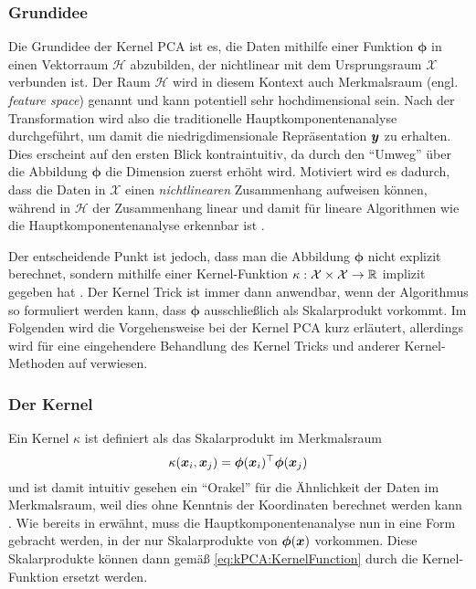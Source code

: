 \subsubsection{Grundidee}
\label{ch:MethodenDerDimRed:statistisch:kPCA:Grundidee}

Die Grundidee der Kernel PCA ist es, die Daten mithilfe einer Funktion $\bm{\phi}$ in einen
Vektorraum $\mathcal{H}$ abzubilden, der nichtlinear mit dem Ursprungsraum $\mathcal{X}$ verbunden
ist. Der Raum $\mathcal{H}$ wird in diesem Kontext auch Merkmalsraum (engl. \textit{feature space})
genannt und kann potentiell sehr hochdimensional sein. Nach der Transformation wird also die
traditionelle Hauptkomponentenanalyse durchgeführt, um damit die niedrigdimensionale Repräsentation
$\bm{y}$ zu erhalten. Dies erscheint auf den ersten Blick kontraintuitiv, da durch den
\enquote{Umweg} über die Abbildung $\bm{\phi}$ die Dimension zuerst erhöht wird. Motiviert wird es
dadurch, dass die Daten in $\mathcal{X}$ einen \textit{nichtlinearen} Zusammenhang aufweisen
können, während in $\mathcal{H}$ der Zusammenhang linear und damit für lineare Algorithmen wie die
Hauptkomponentenanalyse erkennbar ist \parencite[vgl.][26]{ShaweTaylor.2011}.

Der entscheidende Punkt ist jedoch, dass man die Abbildung $\bm{\phi}$ nicht explizit berechnet,
sondern mithilfe einer Kernel-Funktion $\kappa: \mathcal{X} \times \mathcal{X} \rightarrow \mathbb{R}$
implizit gegeben hat \parencites[586 -- 588]{Bishop.2006}[583]{Scholkopf.1997}. Der Kernel Trick ist immer dann anwendbar,
wenn der Algorithmus so formuliert werden kann, dass $\bm{\phi}$ ausschließlich als Skalarprodukt
vorkommt. Im Folgenden wird die Vorgehensweise bei der Kernel PCA kurz erläutert, allerdings wird
für eine eingehendere Behandlung des Kernel Tricks und anderer Kernel-Methoden auf
\textcite{ShaweTaylor.2011} verwiesen.

\subsubsection{Der Kernel}
\label{ch:MethodenDerDimRed:statistisch:kPCA:KernelFunktion}

Ein Kernel $\kappa$ ist definiert als das Skalarprodukt im Merkmalsraum \parencite[34]{ShaweTaylor.2011}
\begin{equation}
	\label{eq:kPCA:KernelFunction}
	\kappa(\bm{x}_i, \bm{x}_j) = \bm{\phi}(\bm{x}_i)^\top \bm{\phi}(\bm{x}_j)
\end{equation}
und ist damit intuitiv gesehen ein \enquote{Orakel} für die Ähnlichkeit der Daten im Merkmalsraum, weil dies ohne Kenntnis der Koordinaten berechnet werden kann \parencite[71]{ShaweTaylor.2011}. Wie bereits in
 erwähnt, muss die
Hauptkomponentenanalyse nun in eine Form gebracht werden, in der nur Skalarprodukte von
$\bm{\phi}(\bm{x})$ vorkommen. Diese Skalarprodukte können dann gemäß
\eqref{eq:kPCA:KernelFunction} durch die Kernel-Funktion ersetzt werden.

